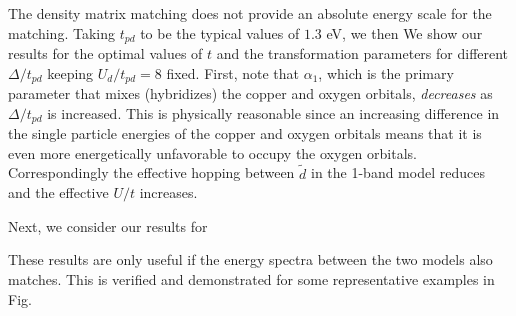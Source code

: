The density matrix matching does not provide an absolute energy scale for the matching. 
Taking $t_{pd}$ to be the typical values of $1.3$ eV, we then 
We show our results for the optimal values of $t$ and the transformation parameters for different $\Delta/t_{pd}$
keeping $U_d/t_{pd}=8$ fixed. First, note that $\alpha_1$, which is the primary parameter that mixes (hybridizes) 
the copper and oxygen orbitals, \emph{decreases} as $\Delta/t_{pd}$ is increased. This is physically reasonable 
since an increasing difference in the single particle energies of the copper and oxygen orbitals 
means that it is even more energetically unfavorable to occupy the oxygen orbitals. 
Correspondingly the effective hopping between $\tilde{d}$ in the 
1-band model reduces and the effective $U/t$ increases. 

Next, we consider our results for  

These results are only useful if the energy spectra between the two models also matches. This is verified 
and demonstrated for some representative examples in Fig.        

